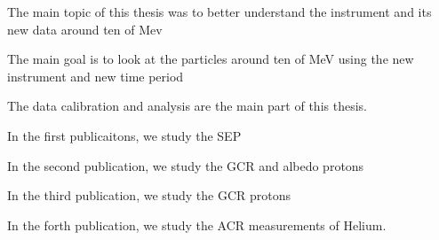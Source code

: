 The main topic of this thesis was to better understand the instrument and its new data around ten of Mev

The main goal is to look at the particles around ten of MeV using the new instrument and new time period

The data calibration and analysis are the main part of this thesis. 

In the first publicaitons, we study the SEP

In the second publication, we study the GCR and albedo protons

In the third publication, we study the GCR protons


In the forth publication, we study the ACR measurements of Helium.





